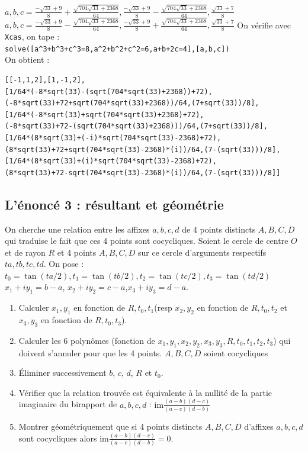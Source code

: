 \documentclass[a4paper,11pt]{book}
\begin{document}
$\displaystyle  a,b,c=\frac{-\sqrt{33}+9}{8}+\frac{\sqrt{704\sqrt{33}+2368}}{64},\frac{-\sqrt{33}+9}{8}-\frac{\sqrt{704\sqrt{33}+2368}}{64},\frac{\sqrt{33}+7}{8}$\\
$\displaystyle a,b,c=\frac{-\sqrt{33}+9}{8}-\frac{\sqrt{704\sqrt{33}+2368}}{64}, \frac{-\sqrt{33}+9}{8}+\frac{\sqrt{704\sqrt{33}+2368}}{64},\frac{\sqrt{33}+7}{8}$
On v\'erifie avec {\tt Xcas}, on tape :\\
{\tt solve([a\verb|^|3+b\verb|^|3+c\verb|^|3=8,a\verb|^|2+b\verb|^|2+c\verb|^|2=6,a+b+2c=4],[a,b,c])}\\
On obtient :
\begin{verbatim}
[[-1,1,2],[1,-1,2],
[1/64*(-8*sqrt(33)-(sqrt(704*sqrt(33)+2368))+72),
(-8*sqrt(33)+72+sqrt(704*sqrt(33)+2368))/64,(7+sqrt(33))/8],
[1/64*(-8*sqrt(33)+sqrt(704*sqrt(33)+2368)+72),
(-8*sqrt(33)+72-(sqrt(704*sqrt(33)+2368)))/64,(7+sqrt(33))/8],
[1/64*(8*sqrt(33)+(-i)*sqrt(704*sqrt(33)-2368)+72),
(8*sqrt(33)+72+sqrt(704*sqrt(33)-2368)*(i))/64,(7-(sqrt(33)))/8],
[1/64*(8*sqrt(33)+(i)*sqrt(704*sqrt(33)-2368)+72),
(8*sqrt(33)+72-sqrt(704*sqrt(33)-2368)*(i))/64,(7-(sqrt(33)))/8]]
\end{verbatim}
\subsection{L'\'enonc\'e 3 : r\'esultant et g\'eom\'etrie}
On cherche une relation entre les affixes $a,b,c,d$
de 4 points distincts $A,B,C,D$ qui traduise le fait que ces 4 points sont 
cocycliques.
Soient le cercle de centre $O$ et de rayon $R$ et 4 points $A,B,C,D$ sur ce 
cercle d'arguments respectifs $ta,tb,tc,td$. On pose :\\
$t_0=\tan(ta/2),t_1=\tan(tb/2),t_2=\tan(tc/2),t_3=\tan(td/2)$\\
$x_1+iy_1=b-a$, $x_2+iy_2=c-a$,$x_3+iy_3=d-a$.
\begin{enumerate}
\item Calculer $x_1,y_1$ en fonction de $R,t_0,t_1$(resp $x_2,y_2$ en fonction de 
$R,t_0,t_2$ et $x_3,y_3$ en fonction de $R,t_0,t_3$).
\item Calculer les 6 polyn\^omes (fonction de $x_1,y_1,x_2,y_2,x_3,y_3,R,t_0,t_1,t_2,t_3$) qui doivent s'annuler pour que les  4 points. 
$A,B,C,D$ soient cocycliques
\item \'Eliminer successivement $b$, $c$, $d$, $R$ et $t_0$.
\item V\'erifier que la relation trouv\'ee est \'equivalente \`a la nullit\'e de la partie imaginaire du birapport de $a,b,c,d$ :
$\displaystyle \mbox{im}\frac{(a-b)(d-c)}{(a-c)(d-b)}$
\item Montrer g\'eom\'etriquement que si 4 points distincts $A,B,C,D$ d'affixes
$a,b,c,d$ sont cocycliques alors $\displaystyle \mbox{im}\frac{(a-b)(d-c)}{(a-c)(d-b)}=0$.
\end{enumerate}
\end{document}
